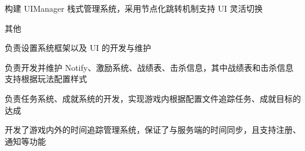 \begin{cventries}
{\begin{cvitems}
{\begin{cvsubitems}
                    \item {构建 UIManager 栈式管理系统，采用节点化跳转机制支持 UI 灵活切换}
                \end{cvsubitems}
            }
            \item {其他
                \begin{cvsubitems}
                    \item {负责设置系统框架以及 UI 的开发与维护}
                    \item {负责开发并维护 Notify、激励系统、战绩表、击杀信息，其中战绩表和击杀信息支持根据玩法配置样式}
                    \item {负责任务系统、成就系统的开发，实现游戏内根据配置文件追踪任务、成就目标的达成}
                    \item {开发了游戏内外的时间追踪管理系统，保证了与服务端的时间同步，且支持注册、通知等功能}
                \end{cvsubitems}
            }
        \end{cvitems}
    }


\end{cventries}
